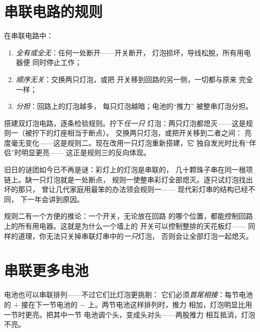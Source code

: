 \section{串联电路的规则}

\begin{proposition}[单一回路的规则]\label{prop:g4:series-circuits:rules}
在串联电路中：
\begin{enumerate}
  \item \emph{全有或全无}：任何一处断开——开关断开，
        灯泡损坏，导线松脱，所有用电器便
        同时停止工作；
  \item \emph{顺序无关}：交换两只灯泡，或把
        开关移到回路的另一侧，一切都与原来
        完全一样；
  \item \emph{分担}：回路上的灯泡越多，
        每只灯泡越暗；电池的“推力”
        被整串灯泡分担。
\end{enumerate}
\end{proposition}

\begin{example}[观察规则]\label{ex:g4:series-circuits:seeing}
搭建双灯泡电路，逐条检验规则。拧下\emph{任一只}
灯泡：两只灯泡都熄灭——这是规则一（被拧下的灯座相当于断点）。
交换两只灯泡，或把开关移到二者之间：
亮度毫无变化——这是规则二。现在改用一只灯泡重新搭建，它
独自发光时比有“伴侣”时明显更亮——
这正是规则三的反向体现。
\end{example}

\begin{example}[彩灯之谜的解答]\label{ex:g4:series-circuits:partylights}
旧日的谜团如今已不再是谜：彩灯上的灯泡是串联的，
几十颗珠子串在同一根项链上。缺一只灯泡就是一处断点，
规则一使整串彩灯全部熄灭。逐只试灯泡找出坏的那只，
曾让几代家庭用最笨的办法领会规则一——
现代彩灯串的结构已经不同，
下一年会讲到原因。
\end{example}

\begin{remark}[开关控制所有用电器]\label{rem:g4:series-circuits:switch}
规则二有一个方便的推论：一个开关，无论放在回路
的哪个位置，都能控制回路上的所有用电器。这就是为什么一个墙上的
开关可以控制整排的天花板灯——
同样的道理，你无法只关掉串联灯串中的\emph{一只}灯泡，
否则会让全部灯泡一起熄灭。
\end{remark}

\section{串联更多电池}

\begin{example}[首尾相接]\label{ex:g4:series-circuits:batteries}
电池也可以串联排列——不过它们比灯泡更挑剔：
它们必须\emph{首尾相接}：每节电池的 $+$
接在下一节电池的 $-$ 上。两节电池这样排列时，推力
相加，灯泡明显比用一节时更亮。把其中一节
电池调个头，变成头对头——两股推力
相互抵消，灯泡不亮。
\end{example}

